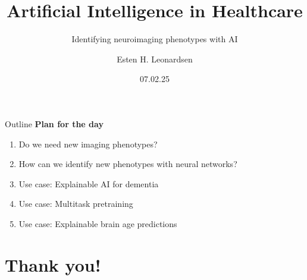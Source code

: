 \documentclass[10pt]{beamer}
\title{Artificial Intelligence in Healthcare}
\subtitle{Identifying neuroimaging phenotypes with AI}
\author{Esten H. Leonardsen}
\date{07.02.25}
\begin{document}
	\begin{frame}
	 	\maketitle
	\end{frame}

    \begin{frame}{Outline}
        \textbf{Plan for the day}
        \begin{enumerate}
            \item Do we need new imaging phenotypes?
            \item How can we identify new phenotypes with neural networks?
            \item Use case: Explainable AI for dementia
            \item Use case: Multitask pretraining
            \item Use case: Explainable brain age predictions
        \end{enumerate}
    \end{frame}

    
    
    
    
    
    
    

    \section{Thank you!}
\end{document}
